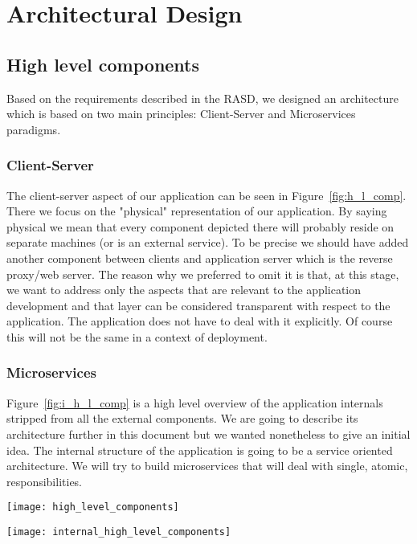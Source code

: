 \pagebreak
\section{Architectural Design}
 
\subsection{High level components}
Based on the requirements described in the RASD, we designed an architecture which is based
on two main principles: Client-Server and Microservices paradigms.

\subsubsection{Client-Server}
The client-server aspect of our application can be seen in Figure~\ref{fig:h_l_comp}.
There we focus on the "physical" representation of our application. By saying physical we mean that
every component depicted there will probably reside on separate machines (or is an external service).
To be precise we should have added another component between clients and
application server which is the reverse proxy/web server. The reason why we preferred to
omit it is that, at this stage, we want to address only the aspects that are relevant to the
application development and that layer can be considered transparent with respect to the application.
The application does not have to deal with it explicitly.
Of course this will not be the same in a context of deployment.

\subsubsection{Microservices}
Figure~\ref{fig:i_h_l_comp} is a high level overview of the application internals stripped from all
the external components. We are going to describe its architecture further in this document
but we wanted nonetheless to give an initial idea.
The internal structure of the application is going to be a service oriented architecture.
We will try to build microservices that will deal with single, atomic, responsibilities.

\begin{sidewaysfigure}
\centering
\texttt{[image: high\_level\_components]}
\caption{Component view: High Level Architecture}
\label{fig:h_l_comp}
\end{sidewaysfigure}

\begin{sidewaysfigure}
\centering
\texttt{[image: internal\_high\_level\_components]}
\caption{Component view: Internal High Level Architecture}
\label{fig:i_h_l_comp}
\end{sidewaysfigure}


